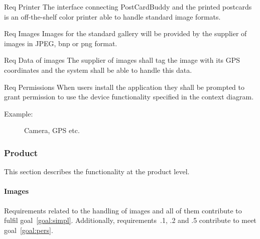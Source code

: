 \documentclass[10pt,a4paper]{article}
\begin{document}
\begin {description}
	\item [Req \thesubsubsection {.\theinterf} Printer] The interface connecting PostCardBuddy and the printed postcards is an off-the-shelf color printer able to handle standard image formats.

	\item [Req \thesubsubsection {.\theinterf} Images] Images for the standard gallery will be provided by the supplier of images in JPEG, bnp or png format.

	\item [Req \thesubsubsection {.\theinterf} Data of images] The supplier of images shall tag the image with its GPS coordinates and the system shall be able to handle this data.

	\item [Req \thesubsubsection {.\theinterf} Permissions] When users install the application they shall be prompted to grant permission to use the device functionality specified in the context diagram.  
	\begin{description}
\item[Example:] Camera, GPS etc.
	\end{description} 
\end{description}

\subsubsection{Product}
This section describes the functionality at the product level. 

\paragraph{Images} 
Requirements related to the handling of images and all of them contribute to fulfil goal~\ref{goal:simpl}. Additionally, requirements~\thesubsubsection .1, \thesubsubsection .2 and \thesubsubsection .5 contribute to meet goal~\ref{goal:pers}.	
\end{document}

